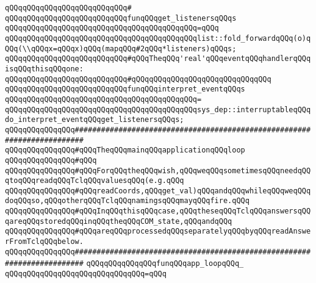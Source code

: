 \verb|qQQqqQQqqQQqqQQqqQQqqQQqqQQq#|\newline
\verb|qQQqqQQqqQQqqQQqqQQqqQQqqQQqfunqQQqget_listenersqQQqs|\newline
\verb|qQQqqQQqqQQqqQQqqQQqqQQqqQQqqQQqqQQqqQQqqQQq=qQQq|\newline
\verb|qQQqqQQqqQQqqQQqqQQqqQQqqQQqqQQqqQQqqQQqqQQqlist::fold_forwardqQQq(o)qQQq(\\qQQqx=qQQqx)qQQq(mapqQQq#2qQQq*listeners)qQQqs;|\newline
\newline
\verb|qQQqqQQqqQQqqQQqqQQqqQQqqQQq#qQQqTheqQQq'real'qQQqeventqQQqhandlerqQQqisqQQqthisqQQqone:|\newline
\verb|qQQqqQQqqQQqqQQqqQQqqQQqqQQq#qQQqqQQqqQQqqQQqqQQqqQQqqQQqqQQq|\newline
\verb|qQQqqQQqqQQqqQQqqQQqqQQqqQQqfunqQQqinterpret_eventqQQqs|\newline
\verb|qQQqqQQqqQQqqQQqqQQqqQQqqQQqqQQqqQQqqQQqqQQq=|\newline
\verb|qQQqqQQqqQQqqQQqqQQqqQQqqQQqqQQqqQQqqQQqqQQqsys_dep::interruptableqQQqdo_interpret_eventqQQqget_listenersqQQqs;|\newline
\newline
\verb|qQQqqQQqqQQqqQQq########################################################################|\newline
\verb|qQQqqQQqqQQqqQQq#qQQqTheqQQqmainqQQqapplicationqQQqloop|\newline
\verb|qQQqqQQqqQQqqQQq#qQQq|\newline
\verb|qQQqqQQqqQQqqQQq#qQQqForqQQqtheqQQqwish,qQQqweqQQqsometimesqQQqneedqQQqtoqQQqreadqQQqTclqQQqvaluesqQQq(e.g.qQQq|\newline
\verb|qQQqqQQqqQQqqQQq#qQQqreadCoords,qQQqget_val)qQQqandqQQqwhileqQQqweqQQqdoqQQqso,qQQqotherqQQqTclqQQqnamingsqQQqmayqQQqfire.qQQq|\newline
\verb|qQQqqQQqqQQqqQQq#qQQqInqQQqthisqQQqcase,qQQqtheseqQQqTclqQQqanswersqQQqareqQQqstoredqQQqinqQQqtheqQQqCOM_state,qQQqandqQQq|\newline
\verb|qQQqqQQqqQQqqQQq#qQQqareqQQqprocessedqQQqseparatelyqQQqbyqQQqreadAnswerFromTclqQQqbelow.|\newline
\verb|qQQqqQQqqQQqqQQq########################################################################|\newline
\newline
\verb|qQQqqQQqqQQqqQQqfunqQQqapp_loopqQQq_|\newline
\verb|qQQqqQQqqQQqqQQqqQQqqQQqqQQqqQQq=qQQq|\newline
